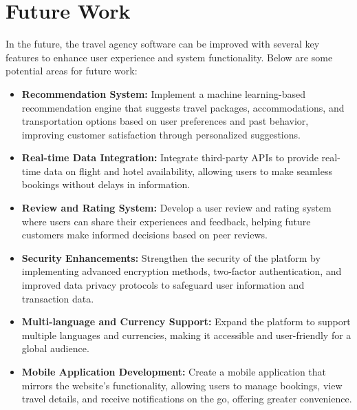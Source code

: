 \documentclass{scrreprt}
\begin{document}
\chapter{Future Work}
In the future, the travel agency software can be improved with several key features to enhance user experience and system functionality. Below are some potential areas for future work:

\begin{itemize}
    \item \textbf{Recommendation System:} Implement a machine learning-based recommendation engine that suggests travel packages, accommodations, and transportation options based on user preferences and past behavior, improving customer satisfaction through personalized suggestions.
    
    \item \textbf{Real-time Data Integration:} Integrate third-party APIs to provide real-time data on flight and hotel availability, allowing users to make seamless bookings without delays in information.
    
    \item \textbf{Review and Rating System:} Develop a user review and rating system where users can share their experiences and feedback, helping future customers make informed decisions based on peer reviews.
    
    \item \textbf{Security Enhancements:} Strengthen the security of the platform by implementing advanced encryption methods, two-factor authentication, and improved data privacy protocols to safeguard user information and transaction data.
    
    \item \textbf{Multi-language and Currency Support:} Expand the platform to support multiple languages and currencies, making it accessible and user-friendly for a global audience.
    
    \item \textbf{Mobile Application Development:} Create a mobile application that mirrors the website’s functionality, allowing users to manage bookings, view travel details, and receive notifications on the go, offering greater convenience.
\end{itemize}
\end{document}
